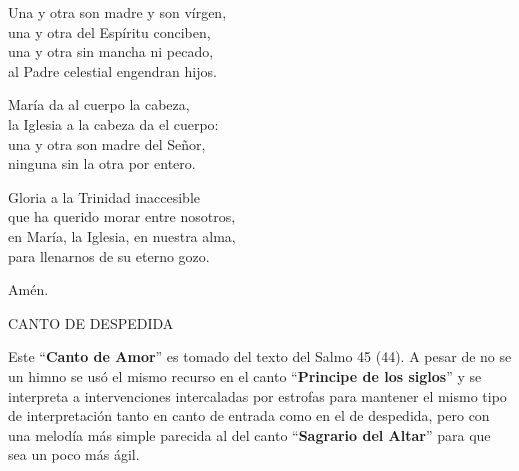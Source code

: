 \documentclass[12pt, letterpaper]{report}
\begin{document}
    \noindent
    Una y otra son madre y son v\'irgen,\\
    una y otra del Esp\'iritu conciben,\\
    una y otra sin mancha ni pecado,\\
    al Padre celestial engendran hijos.

    \noindent
    Mar\'ia da al cuerpo la cabeza,\\
    la Iglesia a la cabeza da el cuerpo:\\
    una y otra son madre del Se\~nor,\\
    ninguna sin la otra por entero.

    \noindent
    Gloria a la Trinidad inaccesible\\
    que ha querido morar entre nosotros,\\
    en Mar\'ia, la Iglesia, en nuestra alma,\\
    para llenarnos de su eterno gozo.

    \noindent
    Am\'en.
    \clearpage




    \begin{center}
      {\large CANTO DE DESPEDIDA}
    \end{center}

    Este ``\textbf{Canto de Amor}'' es tomado del texto del Salmo 45 (44). A pesar de no se un himno se us\'o el mismo recurso en el canto ``\textbf{Principe de los siglos}'' y se interpreta a intervenciones intercaladas por estrofas para mantener el mismo tipo de interpretaci\'on tanto en canto de entrada como en el de despedida, pero con una melod\'ia m\'as simple parecida al del canto ``\textbf{Sagrario del Altar}'' para que sea un poco m\'as \'agil.
\end{document}
